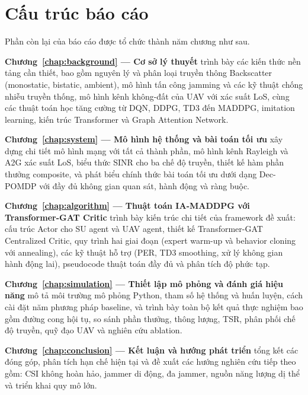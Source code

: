 \section{Cấu trúc báo cáo}
\label{sec:intro:structure}

Phần còn lại của báo cáo được tổ chức thành năm chương như sau.

\textbf{Chương~\ref{chap:background} --- Cơ sở lý thuyết} trình bày các kiến thức nền tảng
cần thiết, bao gồm nguyên lý và phân loại truyền thông Backscatter (monostatic, bistatic,
ambient), mô hình tấn công jamming và các kỹ thuật chống nhiễu truyền thống, mô hình kênh
không-đất của UAV với xác suất LoS, cùng các thuật toán học tăng cường từ DQN, DDPG, TD3
đến MADDPG, imitation learning, kiến trúc Transformer và Graph Attention Network.

\textbf{Chương~\ref{chap:system} --- Mô hình hệ thống và bài toán tối ưu} xây dựng chi tiết
mô hình mạng với tất cả thành phần, mô hình kênh Rayleigh và A2G xác suất LoS, biểu thức
SINR cho ba chế độ truyền, thiết kế hàm phần thưởng composite, và phát biểu chính thức bài
toán tối ưu dưới dạng Dec-POMDP với đầy đủ không gian quan sát, hành động và ràng buộc.

\textbf{Chương~\ref{chap:algorithm} --- Thuật toán IA-MADDPG với Transformer-GAT Critic}
trình bày kiến trúc chi tiết của framework đề xuất: cấu trúc Actor cho SU agent và UAV
agent, thiết kế Transformer-GAT Centralized Critic, quy trình hai giai đoạn (expert warm-up
và behavior cloning với annealing), các kỹ thuật hỗ trợ (PER, TD3 smoothing, xử lý không
gian hành động lai), pseudocode thuật toán đầy đủ và phân tích độ phức tạp.

\textbf{Chương~\ref{chap:simulation} --- Thiết lập mô phỏng và đánh giá hiệu năng} mô tả
môi trường mô phỏng Python, tham số hệ thống và huấn luyện, cách cài đặt năm phương pháp
baseline, và trình bày toàn bộ kết quả thực nghiệm bao gồm đường cong hội tụ, so sánh phần
thưởng, thông lượng, TSR, phân phối chế độ truyền, quỹ đạo UAV và nghiên cứu ablation.

\textbf{Chương~\ref{chap:conclusion} --- Kết luận và hướng phát triển} tổng kết các đóng
góp, phân tích hạn chế hiện tại và đề xuất các hướng nghiên cứu tiếp theo gồm: CSI không
hoàn hảo, jammer di động, đa jammer, nguồn năng lượng dị thể và triển khai quy mô lớn.
